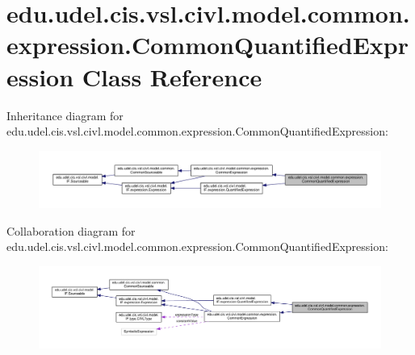 \hypertarget{classedu_1_1udel_1_1cis_1_1vsl_1_1civl_1_1model_1_1common_1_1expression_1_1CommonQuantifiedExpression}{}\section{edu.\+udel.\+cis.\+vsl.\+civl.\+model.\+common.\+expression.\+Common\+Quantified\+Expression Class Reference}
\label{classedu_1_1udel_1_1cis_1_1vsl_1_1civl_1_1model_1_1common_1_1expression_1_1CommonQuantifiedExpression}


Inheritance diagram for edu.\+udel.\+cis.\+vsl.\+civl.\+model.\+common.\+expression.\+Common\+Quantified\+Expression\+:
\nopagebreak
\begin{figure}[H]
\begin{center}
\leavevmode
\includegraphics[width=350pt]{classedu_1_1udel_1_1cis_1_1vsl_1_1civl_1_1model_1_1common_1_1expression_1_1CommonQuantifiedExpression__inherit__graph}
\end{center}
\end{figure}


Collaboration diagram for edu.\+udel.\+cis.\+vsl.\+civl.\+model.\+common.\+expression.\+Common\+Quantified\+Expression\+:
\nopagebreak
\begin{figure}[H]
\begin{center}
\leavevmode
\includegraphics[width=350pt]{classedu_1_1udel_1_1cis_1_1vsl_1_1civl_1_1model_1_1common_1_1expression_1_1CommonQuantifiedExpression__coll__graph}
\end{center}
\end{figure}
